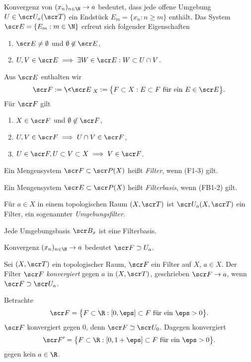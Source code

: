 Konvergenz von $(x_n)_{n\in\N} \to a$ bedeutet, dass jede offene Umgebung $U \in \scr U_a(\scr T)$ ein Endstück $E_m = \{ x_n : n \ge m \}$ enthält.
Das System $\scr E = \{E_m : m \in \N\}$ erfreut sich folgender Eigenschaften
\begin{enumerate}[(FB1),leftmargin=*]
	\item
		$\scr E \neq \emptyset$ und $\emptyset \not\in \scr E$,
	\item
		$U,V \in \scr E \implies \exists W \in \scr E: W \subset U \cap V$.
\end{enumerate}
Aus $\scr E$ enthalten wir
\[
	\scr F
	:= \<\scr E\>_X
	:= \big\{ F \subset X : E \subset F \text{ für ein $E \in \scr E$} \big\}.
\]
Für $\scr F$ gilt
\begin{enumerate}[(F1),leftmargin=*]
	\item
		$X \in \scr F$ und $\emptyset \not\in \scr F$,
	\item
		$U, V \in \scr F \implies U \cap V \in \scr F$,
	\item
		$U \in \scr F, U \subset V \subset X \implies V \in \scr F$.
\end{enumerate}

\begin{df}
	Ein Mengensystem $\scr F \subset \scr P(X)$ heißt \emph{Filter}, wenn (F1-3) gilt.

	Ein Mengensystem $\scr E \subset \scr P(X)$ heißt \emph{Filterbasis}, wenn (FB1-2) gilt.
\end{df}

\begin{ex}
	Für $a \in X$ in einem topologischen Raum $(X, \scr T)$ ist $\scr U_a(X, \scr T)$ ein Filter, ein sogenannter \emph{Umgebungsfilter}.

	Jede Umgebungsbasis $\scr B_x$ ist eine Filterbasis.
\end{ex}

\begin{nt}
	Konvergenz $(x_n)_{n\in\N} \to a$ bedeutet $\scr F \supset U_a$.
\end{nt}

\begin{df}
	Sei $(X, \scr T)$ ein topologischer Raum, $\scr F$ ein Filter auf $X$, $a \in X$.
	Der Filter $\scr F$ \emph{konvergiert} gegen $a$ in $(X, \scr T)$, geschrieben $\scr F \to a$, wenn $\scr F \supset \scr U_a$.
\end{df}

\begin{ex}
	Betrachte
	\[
		\scr F = \big\{ F \subset \R : [0,\eps] \subset F \text{ für ein $\eps > 0$} \big\}.
	\]
	$\scr F$ konvergiert gegen $0$, denn $\scr F \supset \scr U_0$.
	Dagegen konvergiert
	\[
		\scr F' = \big\{ F \subset \R : [0,1+\eps] \subset F \text{ für ein $\eps > 0$} \big\}.
	\]
	gegen kein $a \in \R$.
\end{ex}

